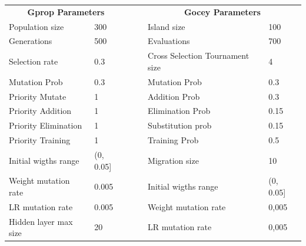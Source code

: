 \begin{table}[h!]
\centering
\begin{tabular}{llll|l|l|}
\cline{1-2} \cline{5-6}
\multicolumn{2}{|c|}{\textbf{Gprop Parameters}}                              &  &  & \multicolumn{2}{c|}{\textbf{Gocey Parameters}} \\ \cline{1-2} \cline{5-6} 
\multicolumn{1}{|l|}{Population size}       & \multicolumn{1}{l|}{300}       &  &  & Island size                       & 100         \\ \cline{1-2} \cline{5-6} 
\multicolumn{1}{|l|}{Generations}           & \multicolumn{1}{l|}{500}       &  &  & Evaluations                       & 700         \\ \cline{1-2} \cline{5-6} 
\multicolumn{1}{|l|}{Selection rate}        & \multicolumn{1}{l|}{0.3}       &  &  & Cross Selection Tournament size   & 4           \\ \cline{1-2} \cline{5-6} 
\multicolumn{1}{|l|}{Mutation Prob}         & \multicolumn{1}{l|}{0.3}       &  &  & Mutation Prob                     & 0.3         \\ \cline{1-2} \cline{5-6} 
\multicolumn{1}{|l|}{Priority Mutate}       & \multicolumn{1}{l|}{1}         &  &  & Addition Prob                     & 0.3         \\ \cline{1-2} \cline{5-6} 
\multicolumn{1}{|l|}{Priority Addition}     & \multicolumn{1}{l|}{1}         &  &  & Elimination Prob                  & 0.15        \\ \cline{1-2} \cline{5-6} 
\multicolumn{1}{|l|}{Priority Elimination}  & \multicolumn{1}{l|}{1}         &  &  & Substitution prob                 & 0.15        \\ \cline{1-2} \cline{5-6} 
\multicolumn{1}{|l|}{Priority Training}     & \multicolumn{1}{l|}{1}         &  &  & Training Prob                     & 0.5         \\ \cline{1-2} \cline{5-6} 
\multicolumn{1}{|l|}{Initial wigths range}  & \multicolumn{1}{l|}{(0, 0.05]} &  &  & Migration size                    & 10          \\ \cline{1-2} \cline{5-6} 
\multicolumn{1}{|l|}{Weight mutation rate}  & \multicolumn{1}{l|}{0.005}     &  &  & Initial wigths range              & (0, 0.05]   \\ \cline{1-2} \cline{5-6} 
\multicolumn{1}{|l|}{LR mutation rate}      & \multicolumn{1}{l|}{0.005}     &  &  & Weight mutation rate              & 0,005       \\ \cline{1-2} \cline{5-6} 
\multicolumn{1}{|l|}{Hidden layer max size} & \multicolumn{1}{l|}{20}        &  &  & LR mutation rate                  & 0,005       \\ \cline{1-2} \cline{5-6} 

\end{tabular}
\end{table}
